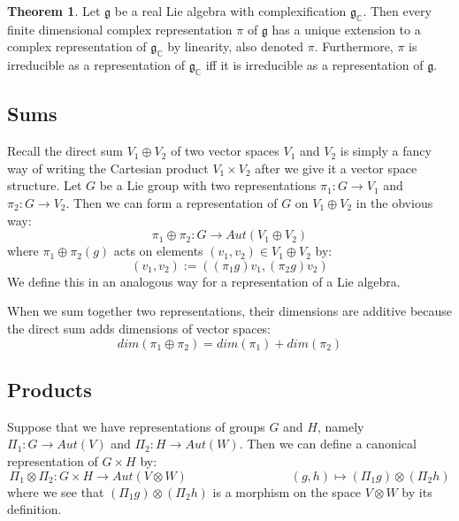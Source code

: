\documentclass[11pt, oneside]{article}   	%
\theoremstyle{definition}
\newtheorem{theorem}{Theorem}[section]
\begin{document}
\begin{theorem}
	Let $\mathfrak g$ be a real Lie algebra with complexification $\mathfrak g_\mathbb{C}$. Then every finite dimensional complex 
	representation $\pi$ of $\mathfrak g$ has a unique extension to a complex representation of $\mathfrak g_{\mathbb C}$ by linearity, 
	also denoted $\pi$. Furthermore, $\pi$ is irreducible as a representation of $\mathfrak g_{\mathbb C}$ iff it is irreducible as a 
	representation of $\mathfrak g$. 
\end{theorem}

\subsection{Sums}

Recall the direct sum $V_1\oplus V_2$ of two vector spaces $V_1$ and $V_2$ is simply a fancy way of writing 
the Cartesian product $V_1\times V_2$ after we give it a vector space structure. 
Let $G$ be a Lie group with two representations $\pi_1 : G\rightarrow V_1$ and $\pi_2 : G\rightarrow V_2$. 
Then we can form a representation of $G$ on $V_1\oplus V_2$ in the obvious way:
\begin{equation}
	\pi_1\oplus\pi_2 : G\rightarrow Aut(V_1\oplus V_2)
\end{equation}
where $\pi_1\oplus\pi_2(g)$ acts on elements $(v_1, v_2)\in V_1\oplus V_2$ by:
\begin{equation}
	[(\pi_1\oplus \pi_2)g] (v_1, v_2) := ((\pi_1g)v_1, (\pi_2g)v_2)
\end{equation}
We define this in an analogous way for a representation of a Lie algebra. 

When we sum together two representations, their dimensions are additive because the direct sum adds 
dimensions of vector spaces:
\begin{equation}
	dim(\pi_1\oplus\pi_2) = dim(\pi_1) + dim(\pi_2)
\end{equation}

\subsection{Products}

Suppose that we have representations of groups $G$ and $H$, namely $\Pi_1 : G\rightarrow Aut(V)$ and 
$\Pi_2 : H\rightarrow Aut(W)$. Then we can define a canonical representation of $G\times H$ by:
\begin{equation}
	\Pi_1\otimes\Pi_2 : G\times H\rightarrow Aut(V\otimes W)\;\;\;\;\;\;\;\;\;\;\;\;\;\;\;\;\;\;\;\;\;\;\;\;\;\;\;\;\;\;
	(g, h)\mapsto (\Pi_1 g)\otimes (\Pi_2 h)
\end{equation}
where we see that $(\Pi_1 g)\otimes (\Pi_2 h)$ is a morphism on the space $V\otimes W$ by its 
definition. 
\end{document}
